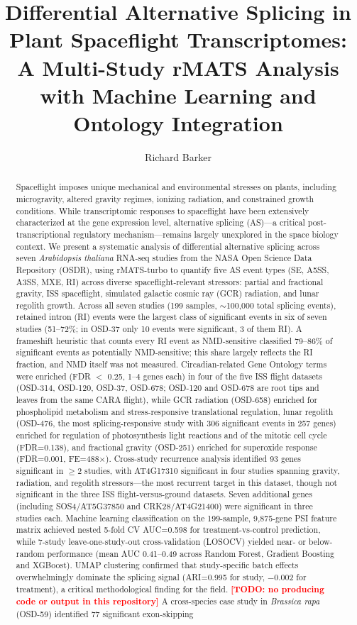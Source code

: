 \documentclass[12pt,a4paper]{article}
\title{Differential Alternative Splicing in Plant Spaceflight Transcriptomes: \\
A Multi-Study rMATS Analysis with Machine Learning and Ontology Integration}
\author{Richard Barker}
\date{}
\newcommand{\TODO}[1]{\textcolor{red}{\textbf{[TODO: #1]}}}
\begin{document}
\maketitle

\begin{abstract}
Spaceflight imposes unique mechanical and environmental stresses on plants, including microgravity, altered gravity regimes, ionizing radiation, and constrained growth conditions. While transcriptomic responses to spaceflight have been extensively characterized at the gene expression level, alternative splicing (AS)---a critical post-transcriptional regulatory mechanism---remains largely unexplored in the space biology context. We present a systematic analysis of differential alternative splicing across seven \textit{Arabidopsis thaliana} RNA-seq studies from the NASA Open Science Data Repository (OSDR), using rMATS-turbo to quantify five AS event types (SE, A5SS, A3SS, MXE, RI) across diverse spaceflight-relevant stressors: partial and fractional gravity, ISS spaceflight, simulated galactic cosmic ray (GCR) radiation, and lunar regolith growth. Across all seven studies (199 samples, $\sim$100,000 total splicing events), retained intron (RI) events were the largest class of significant events in six of seven studies (51--72\%; in OSD-37 only 10 events were significant, 3 of them RI). A frameshift heuristic that counts every RI event as NMD-sensitive classified 79--86\% of significant events as potentially NMD-sensitive; this share largely reflects the RI fraction, and NMD itself was not measured. Circadian-related Gene Ontology terms were enriched (FDR $<$ 0.25, 1--4 genes each) in four of the five ISS flight datasets (OSD-314, OSD-120, OSD-37, OSD-678; OSD-120 and OSD-678 are root tips and leaves from the same CARA flight), while GCR radiation (OSD-658) enriched for phospholipid metabolism and stress-responsive translational regulation, lunar regolith (OSD-476, the most splicing-responsive study with 306 significant events in 257 genes) enriched for regulation of photosynthesis light reactions and of the mitotic cell cycle (FDR=0.138), and fractional gravity (OSD-251) enriched for superoxide response (FDR=0.001, FE=488$\times$). Cross-study recurrence analysis identified 93 genes significant in $\geq$2 studies, with AT4G17310 significant in four studies spanning gravity, radiation, and regolith stressors---the most recurrent target in this dataset, though not significant in the three ISS flight-versus-ground datasets. Seven additional genes (including SOS4/AT5G37850 and CRK28/AT4G21400) were significant in three studies each. Machine learning classification on the 199-sample, 9,875-gene PSI feature matrix achieved nested 5-fold CV AUC=0.598 for treatment-vs-control prediction, while 7-study leave-one-study-out cross-validation (LOSOCV) yielded near- or below-random performance (mean AUC 0.41--0.49 across Random Forest, Gradient Boosting and XGBoost). UMAP clustering confirmed that study-specific batch effects overwhelmingly dominate the splicing signal (ARI=0.995 for study, $-$0.002 for treatment), a critical methodological finding for the field. \TODO{no producing code or output in this repository} A cross-species case study in \textit{Brassica rapa} (OSD-59) identified 77 significant exon-skipping 
\end{abstract}
\end{document}
